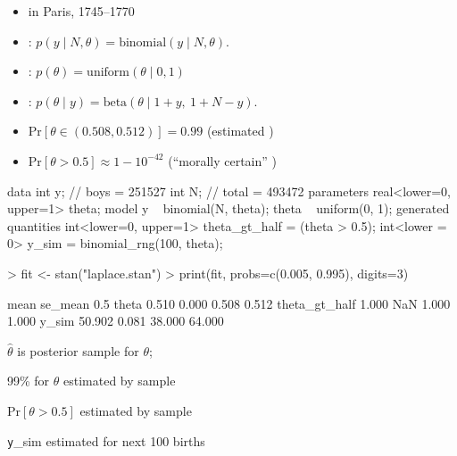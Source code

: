 \documentclass[9pt]{report}
\begin{document}

\begin{itemize}
\item {} in Paris, 1745--1770
\item {}:
$p(y \mid N, \theta)
 = \textrm{binomial}(y \mid N, \theta).$
\item {}:
$p(\theta)
 = \textrm{uniform}(\theta \mid 0, 1)$
\item {}:
$p(\theta \mid y)
 = \textrm{beta}(\theta \mid 1 + y, \ 1 + N - y).$
\vfill
\item {$\textrm{Pr}[\theta \in (0.508, 0.512)] = 0.99$}
\hfill {\small (estimated )}
\item {$\textrm{Pr}[\theta > 0.5] \approx 1 - 10^{-42}$}
\hfill {\small (``morally certain'' )}
\end{itemize}

\begin{stancode}
data {
  int y;  // boys = 251527
  int N;  // total = 493472
}
parameters {
  real<lower=0, upper=1> theta;
}
model {
  y ~ binomial(N, theta);
  theta ~ uniform(0, 1);
}
generated quantities {
  int<lower=0, upper=1> theta_gt_half = (theta > 0.5);
  int<lower = 0> y_sim = binomial_rng(100, theta);
}
\end{stancode}

%
\begin{codein}
> fit <- stan("laplace.stan")
> print(fit, probs=c(0.005, 0.995), digits=3)
\end{codein}
\begin{codeout}
                     mean se_mean   0.5%
theta               0.510   0.000  0.508   0.512
theta_gt_half       1.000     NaN  1.000   1.000
y_sim              50.902   0.081 38.000  64.000
\end{codeout}
%
\begin{subitemize}
\item {} $\hat{\theta}$ is posterior sample  for $\theta$;
\item 99\%  for $\theta$ estimated by sample 
\item $\textrm{Pr}[\theta > 0.5]$ estimated by sample 
\item {\texttt y\_sim} estimated  for next 100 births
\end{subitemize}
\end{document}
